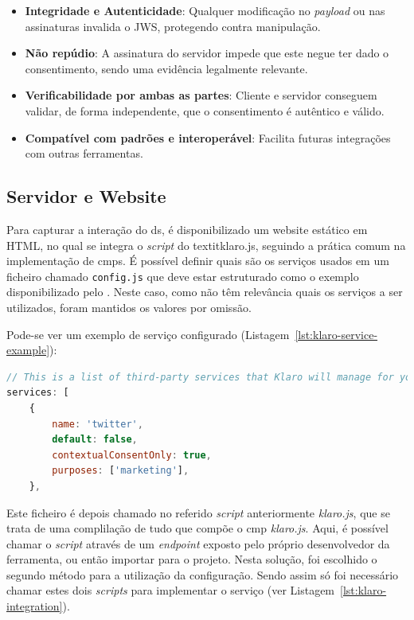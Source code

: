 \begin{itemize}
  \item \textbf{Integridade e Autenticidade}: Qualquer modificação no \textit{payload} ou nas assinaturas invalida o JWS, protegendo contra manipulação.
  \item \textbf{Não repúdio}: A assinatura do servidor impede que este negue ter dado o consentimento, sendo uma evidência legalmente relevante.
  \item \textbf{Verificabilidade por ambas as partes}: Cliente e servidor conseguem validar, de forma independente, que o consentimento é autêntico e válido.
  \item \textbf{Compatível com padrões e interoperável}: Facilita futuras integrações com outras ferramentas.
\end{itemize}


\subsection{Servidor e Website}

Para capturar a interação do \acrshort{ds}, é disponibilizado um website estático em HTML, no qual se integra o \textit{script} do textit{klaro.js}, seguindo a prática comum na implementação de \acrshort{cmp}s.
É possível definir quais são os serviços usados em um ficheiro chamado \texttt{config.js} que deve estar estruturado como o exemplo disponibilizado pelo \cite{gitklaro}. Neste caso, como não têm relevância quais os serviços a ser utilizados, foram mantidos os valores por omissão.

Pode-se ver um exemplo de serviço configurado (Listagem~\ref{lst:klaro-service-example}):


\begin{lstlisting}[language=Javascript, caption={Exemplo de serviço configurado no \textit{klaro.js}}, label={lst:klaro-service-example}]
// This is a list of third-party services that Klaro will manage for you.
services: [
	{
		name: 'twitter',
		default: false,
		contextualConsentOnly: true,
		purposes: ['marketing'],
	},
\end{lstlisting}

Este ficheiro é depois chamado no referido \textit{script} anteriormente \textit{klaro.js}, que se trata de uma complilação de tudo que compõe o \acrshort{cmp} \textit{klaro.js}. Aqui, é possível chamar o \textit{script} através de um \textit{endpoint} exposto pelo próprio desenvolvedor da ferramenta, ou então importar para o projeto. Nesta solução, foi escolhido o segundo método para a utilização da configuração.
Sendo assim só foi necessário chamar estes dois \textit{scripts} para implementar o serviço (ver Listagem~\ref{lst:klaro-integration}).

